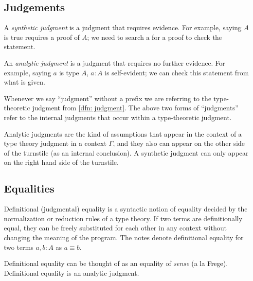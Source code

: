 \documentclass{article}
\begin{document}
\subsection{Judgements}

\begin{definition}[Harper]
  A \emph{synthetic judgment} is a judgment that requires evidence. For example, saying $A$ is true requires a proof of $A$; we need to search a for a proof to check the statement.
\end{definition}

\begin{definition}[Harper]
  An \emph{analytic judgment} is a judgment that requires no further evidence. For example, saying $a$ is type $A$, $a : A$ is self-evident; we can check this statement from what is given.
\end{definition}
\begin{remark}
  Whenever we say ``judgment'' without a prefix we are referring to the type-theoretic judgment from \cref{dfn: judgment}. The above two forms of ``judgments'' refer to the internal judgments that occur within a type-theoretic judgment.
\end{remark}

\begin{remark}
  Analytic judgments are the kind of assumptions that appear in the context of a type theory judgment in a context $\Gamma$, and they also can appear on the other side of the turnstile (as an internal conclusion). A synthetic judgment can only appear on the right hand side of the turnstile.
\end{remark}

\subsection{Equalities}

\begin{definition}
  Definitional (judgmental) equality is a syntactic notion of equality decided by the normalization or reduction rules of a type theory. If two terms are definitionally equal, they can be freely substituted for each other in any context without changing the meaning of the program. The notes denote definitional equality for two terms $a, b : A$ as $a \equiv b$.
\end{definition}

\begin{remark}[?]
  Definitional equality can be thought of as an equality of \emph{sense} (a la Frege). Definitional equality is an analytic judgment.
\end{remark}
\end{document}
